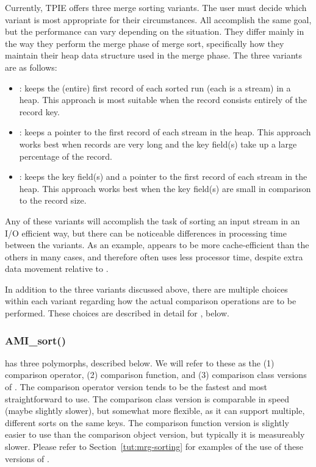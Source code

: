Currently, TPIE offers three merge sorting variants. The
user must decide which variant is most appropriate for their
circumstances.  All accomplish the same goal, but the
performance can vary depending on the situation. They differ
mainly in the way they perform the merge phase of merge
sort, specifically how they maintain their heap data
structure used in the merge phase. The three variants are as
follows:
\begin{itemize}
    \item {}: keeps the (entire) first record
    of each sorted run (each is a stream) in a heap. This
    approach is most suitable when the record consists
    entirely of the record key.
    
    \item {}: keeps a pointer to the
    first record of each stream in the heap. This approach
    works best when records are very long and the key
    field(s) take up a large percentage of the record.

    \item {}: keeps the key field(s) and
    a pointer to the first record of each stream in the
    heap. This approach works best when the key field(s) are
    small in comparison to the record size.
\end{itemize}

Any of these variants will accomplish the task of sorting an
input stream in an I/O efficient way, but there can be
noticeable differences in processing time between the
variants. As an example,  appears to be
more cache-efficient than the others in many cases, and
therefore often uses less processor time, despite extra data
movement relative to .

In addition to the three variants discussed above, there are
multiple choices within each variant regarding how the
actual comparison operations are to be performed. These
choices are described in detail for , below.

\subsubsection{AMI\_sort()}
 has three polymorphs, described below.
We will refer to these as the (1) comparison operator, (2)
comparison function, and (3) comparison class versions of
. The comparison operator version tends to
be the fastest and most straightforward to use. The
comparison class version is comparable in speed (maybe
slightly slower), but somewhat more flexible, as it can support
multiple, different sorts on the same keys. The comparison
function version is slightly easier to use than the
comparison object version, but typically it is measureably slower.
Please refer to Section~\ref{tut:mrg-sorting} for examples
of the use of these versions of .


